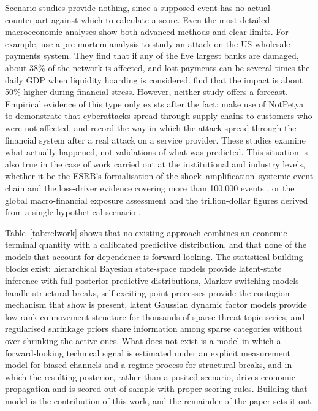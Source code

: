\documentclass[review]{elsarticle}
\begin{document}
Scenario studies provide nothing, since a supposed event has no actual counterpart against which to calculate a score. Even the most detailed macroeconomic analyses show both advanced methods and clear limits. For example, \citet{eisenbach2022} use a pre-mortem analysis to study an attack on the US wholesale payments system. They find that if any of the five largest banks are damaged, about 38\% of the network is affected, and lost payments can be several times the daily GDP when liquidity hoarding is considered. \citet{eisenbach2025} find that the impact is about 50\% higher during financial stress. However, neither study offers a forecast. Empirical evidence of this type only exists after the fact: \citet{crosignani2023} make use of NotPetya to demonstrate that cyberattacks spread through supply chains to customers who were not affected, and \citet{kotidis2025} record the way in which the attack spread through the financial system after a real attack on a service provider. These studies examine what actually happened, not validations of what was predicted. This situation is also true in the case of work carried out at the institutional and industry levels, whether it be the ESRB's formalisation of the shock--amplification--systemic-event chain \citep{esrb2020} and the loss-driver evidence covering more than 100,000 events \citep{aldasoro2020}, or the global macro-financial exposure assessment \citep{imf2024} and the trillion-dollar figures derived from a single hypothetical scenario \citep{lloyds2023}.

Table~\ref{tab:relwork} shows that no existing approach combines an economic terminal quantity with a calibrated predictive distribution, and that none of the models that account for dependence is forward-looking. The statistical building blocks exist: hierarchical Bayesian state-space models provide latent-state inference with full posterior predictive distributions, Markov-switching models \citep{hamilton1989} handle structural breaks, self-exciting point processes \citep{hawkes1971} provide the contagion mechanism that \citet{bessyroland2021} show is present, latent Gaussian dynamic factor models \citep{kim2025} provide low-rank co-movement structure for thousands of sparse threat-topic series, and regularised shrinkage priors \citep{piironen2017} share information among sparse categories without over-shrinking the active ones. What does not exist is a model in which a forward-looking technical signal is estimated under an explicit measurement model for biased channels and a regime process for structural breaks, and in which the resulting posterior, rather than a posited scenario, drives economic propagation and is scored out of sample with proper scoring rules. Building that model is the contribution of this work, and the remainder of the paper sets it out.
\end{document}
